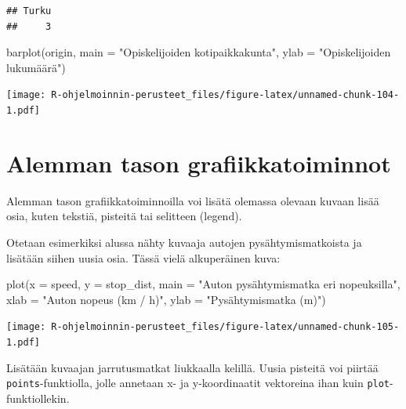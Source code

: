\documentclass[
]{book}
\newenvironment{Shaded}{\begin{snugshade}}{\end{snugshade}}
\newcommand{\AttributeTok}[1]{\textcolor[rgb]{0.77,0.63,0.00}{#1}}
\newcommand{\FunctionTok}[1]{\textcolor[rgb]{0.00,0.00,0.00}{#1}}
\newcommand{\NormalTok}[1]{#1}
\newcommand{\StringTok}[1]{\textcolor[rgb]{0.31,0.60,0.02}{#1}}
\begin{document}
\begin{verbatim}
## Turku 
##     3
\end{verbatim}

\begin{Shaded}
\begin{Highlighting}[]
\FunctionTok{barplot}\NormalTok{(origin, }
        \AttributeTok{main =} \StringTok{"Opiskelijoiden kotipaikkakunta"}\NormalTok{,}
        \AttributeTok{ylab =} \StringTok{"Opiskelijoiden lukumäärä"}\NormalTok{)}
\end{Highlighting}
\end{Shaded}

\texttt{[image: R-ohjelmoinnin-perusteet\_files/figure-latex/unnamed-chunk-104-1.pdf]}

\hypertarget{alemman-tason-grafiikkatoiminnot}{%
\section{Alemman tason grafiikkatoiminnot}\label{alemman-tason-grafiikkatoiminnot}}

Alemman tason grafiikkatoiminnoilla voi lisätä olemassa olevaan kuvaan lisää osia, kuten tekstiä, pisteitä tai selitteen (legend).

Otetaan esimerkiksi alussa nähty kuvaaja autojen pysähtymismatkoista ja lisätään siihen uusia osia. Tässä vielä alkuperäinen kuva:

\begin{Shaded}
\begin{Highlighting}[]
\FunctionTok{plot}\NormalTok{(}\AttributeTok{x =}\NormalTok{ speed, }\AttributeTok{y =}\NormalTok{ stop\_dist,}
     \AttributeTok{main =} \StringTok{"Auton pysähtymismatka eri nopeuksilla"}\NormalTok{,}
     \AttributeTok{xlab =} \StringTok{"Auton nopeus (km / h)"}\NormalTok{, }\AttributeTok{ylab =} \StringTok{"Pysähtymismatka (m)"}\NormalTok{)}
\end{Highlighting}
\end{Shaded}

\texttt{[image: R-ohjelmoinnin-perusteet\_files/figure-latex/unnamed-chunk-105-1.pdf]}

Lisätään kuvaajan jarrutusmatkat liukkaalla kelillä. Uusia pisteitä voi piirtää \texttt{points}-funktiolla, jolle annetaan x- ja y-koordinaatit vektoreina ihan kuin \texttt{plot}-funktiollekin.
\end{document}
